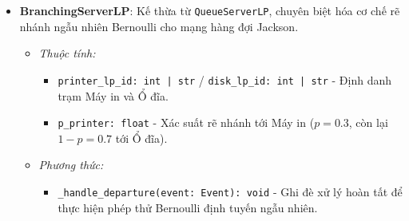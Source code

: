 \begin{itemize}[leftmargin=1.5em, itemsep=8pt]
\begin{itemize}[leftmargin=1.2em, label={}, itemsep=3pt]
\item[\textendash] \textit{Phương thức:}
\begin{itemize}[leftmargin=1.5em, label=+, itemsep=2pt]
\item \texttt{handle\_event(event: Event): void} - Phân luồng sự kiện \texttt{ARRIVAL} hoặc \texttt{DEPARTURE}.
\item \texttt{\_handle\_arrival(event: Event): void} - Kiểm tra tràn đệm $K$, loại bỏ gói tin nếu đầy, phân bổ server rảnh hoặc xếp hàng.
\item \texttt{\_start\_service(job: Job, current\_time: float): void} - Đặt mốc bắt đầu phục vụ, bốc thời gian phục vụ $S \sim \text{Exp}(\mu)$ và lên lịch hoàn tất.
\item \texttt{\_handle\_departure(event: Event): void} - Ghi nhận số đo hoàn tất, chuyển Job sang trạm sau và đón khách kế tiếp từ hàng đợi.
\item \texttt{\_notify\_state(current\_time: float): void} - Cập nhật trạng thái tích phân diện tích theo thời gian.
\item \texttt{finalize(): void} / \texttt{get\_metrics(): Dict[str, Any]} - Chốt sổ và trích xuất vector chỉ số hiệu năng.
\end{itemize}
\end{itemize}

\item \textbf{BranchingServerLP}: Kế thừa từ \texttt{QueueServerLP}, chuyên biệt hóa cơ chế rẽ nhánh ngẫu nhiên Bernoulli cho mạng hàng đợi Jackson.

\begin{itemize}[leftmargin=1.2em, label={}, itemsep=3pt]
\item[\textendash] \textit{Thuộc tính:}
\begin{itemize}[leftmargin=1.5em, label=+, itemsep=2pt]
\item \texttt{printer\_lp\_id: int | str} / \texttt{disk\_lp\_id: int | str} - Định danh trạm Máy in và Ổ đĩa.
\item \texttt{p\_printer: float} - Xác suất rẽ nhánh tới Máy in ($p = 0.3$, còn lại $1-p = 0.7$ tới Ổ đĩa).
\end{itemize}

\item[\textendash] \textit{Phương thức:}
\begin{itemize}[leftmargin=1.5em, label=+, itemsep=2pt]
\item \texttt{\_handle\_departure(event: Event): void} - Ghi đè xử lý hoàn tất để thực hiện phép thử Bernoulli định tuyến ngẫu nhiên.
\end{itemize}
\end{itemize}


\end{itemize}
